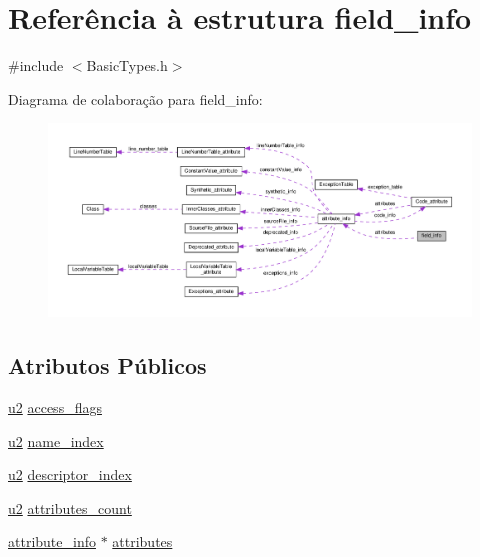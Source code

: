 \hypertarget{structfield__info}{}\section{Referência à estrutura field\+\_\+info}
\label{structfield__info}


{\ttfamily \#include $<$Basic\+Types.\+h$>$}



Diagrama de colaboração para field\+\_\+info\+:
\nopagebreak
\begin{figure}[H]
\begin{center}
\leavevmode
\includegraphics[width=350pt]{structfield__info__coll__graph}
\end{center}
\end{figure}
\subsection*{Atributos Públicos}
\begin{DoxyCompactItemize}
\item 
\hyperlink{BasicTypes_8h_a732cde1300aafb73b0ea6c2558a7a54f}{u2} \hyperlink{structfield__info_aa622dc9a5b5353d2f3eb2f416dacab4b}{access\+\_\+flags}
\item 
\hyperlink{BasicTypes_8h_a732cde1300aafb73b0ea6c2558a7a54f}{u2} \hyperlink{structfield__info_a425e3ae85badd81c67ef00acca85ad9e}{name\+\_\+index}
\item 
\hyperlink{BasicTypes_8h_a732cde1300aafb73b0ea6c2558a7a54f}{u2} \hyperlink{structfield__info_a12dd492b7fb1d61da1ac14938d97b07f}{descriptor\+\_\+index}
\item 
\hyperlink{BasicTypes_8h_a732cde1300aafb73b0ea6c2558a7a54f}{u2} \hyperlink{structfield__info_a83bfa4ff84a608e3dbd1c3968ebe1b80}{attributes\+\_\+count}
\item 
\hyperlink{structattribute__info}{attribute\+\_\+info} $\ast$ \hyperlink{structfield__info_afdda114944ae5eaae78c237f99257108}{attributes}
\end{DoxyCompactItemize}


